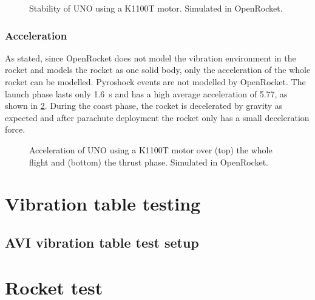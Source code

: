 \documentclass[a4paper,11pt]{article}
\begin{document}
\begin{figure}[H]
  
  \label{fig:openrocket-k-stability}
  \caption{Stability of UNO using a K1100T motor. Simulated in OpenRocket.}
\end{figure}

\subsubsection{Acceleration}

As stated, since OpenRocket does not model the vibration environment in the rocket and models the rocket as one solid body, only the acceleration of the whole rocket can be modelled. Pyroshock events are not modelled by OpenRocket. The launch phase lasts only \SI{1.6}{\second} and has a high average acceleration of \SI{5.77}{\gacc}, as shown in \ref{fig:openrocket-k-acceleration}. During the coast phase, the rocket is decelerated by gravity as expected and after parachute deployment the rocket only has a small deceleration force.

\begin{figure}[H]
  
  
  \label{fig:openrocket-k-acceleration}
  \caption{Acceleration of UNO using a K1100T motor over (top) the whole flight and (bottom) the thrust phase. Simulated in OpenRocket.}
\end{figure}



\section{Vibration table testing}
\subsection{AVI vibration table test setup}



\section{Rocket test}

\end{document}
